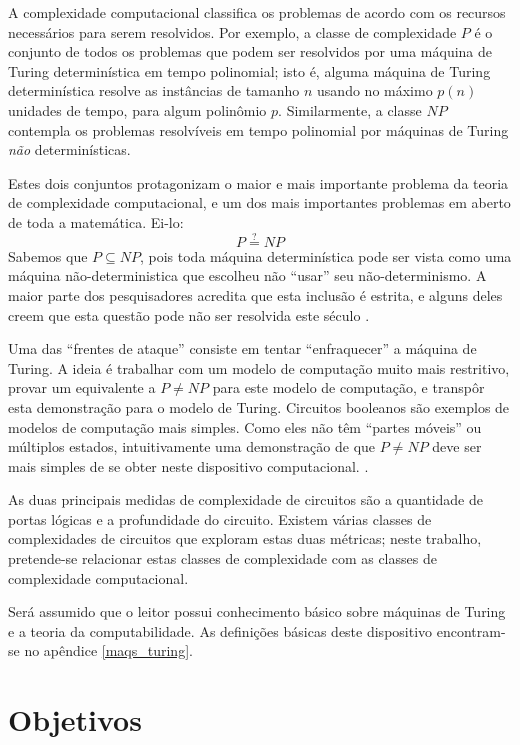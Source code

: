 A complexidade computacional classifica os problemas
de acordo com os recursos necessários para serem resolvidos.
Por exemplo,
a classe de complexidade $P$
é o conjunto de todos os problemas que podem ser resolvidos
por uma máquina de Turing determinística
em tempo polinomial;
isto é,
alguma máquina de Turing determinística
resolve as instâncias de tamanho $n$
usando no máximo $p(n)$ unidades de tempo,
para algum polinômio $p$.
Similarmente,
a classe $NP$
contempla os problemas resolvíveis em tempo polinomial
por máquinas de Turing \emph{não} determinísticas.

Estes dois conjuntos protagonizam
o maior e mais importante problema da teoria de complexidade computacional,
e um dos mais importantes problemas em aberto de toda a matemática.
Ei-lo:
\begin{displaymath}
    P \stackrel?= NP
\end{displaymath}
\cite[p. 270]{Sipser2006}
Sabemos que $P \subseteq NP$,
pois toda máquina determinística pode ser vista como
uma máquina não-deterministica que escolheu não ``usar''
seu não-determinismo.
A maior parte dos pesquisadores acredita que
esta inclusão é estrita,
e alguns deles creem que esta questão
pode não ser resolvida este século
\cite[p. 2]{Gasarch2012}.

Uma das ``frentes de ataque''
consiste em tentar ``enfraquecer''
a máquina de Turing.
A ideia é trabalhar com um modelo de computação muito mais restritivo,
provar um equivalente a $P \neq NP$
para este modelo de computação,
e transpôr esta demonstração para o modelo de Turing.
Circuitos booleanos
são exemplos de modelos de computação mais simples.
Como eles não têm ``partes móveis''
ou múltiplos estados,
intuitivamente uma demonstração de que $P \neq NP$
deve ser mais simples de se obter
neste dispositivo computacional. \cite{Hastad1987}.

As duas principais medidas
de complexidade de circuitos
são a quantidade de portas lógicas
e a profundidade do circuito.
Existem várias classes de complexidades de circuitos
que exploram estas duas métricas;
neste trabalho,
pretende-se relacionar estas classes de complexidade
com as classes de complexidade computacional.

Será assumido que o leitor possui conhecimento básico
sobre máquinas de Turing e a teoria da computabilidade.
As definições básicas deste dispositivo
encontram-se no apêndice \ref{maqs_turing}.

\section{Objetivos}

